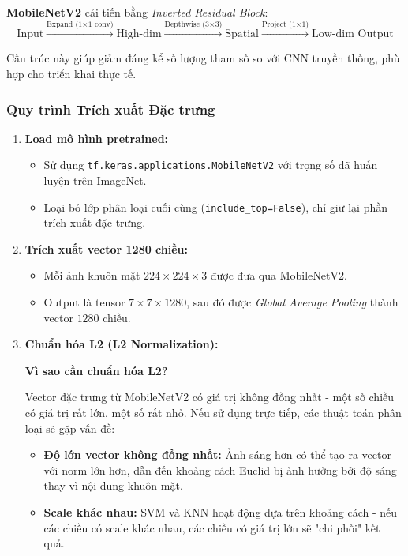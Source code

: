 \documentclass[a4paper]{book}
\begin{document}
\textbf{MobileNetV2} cải tiến bằng \textit{Inverted Residual Block}:
\[
\text{Input} \xrightarrow{\text{Expand (1×1 conv)}} \text{High-dim} \xrightarrow{\text{Depthwise (3×3)}} \text{Spatial} \xrightarrow{\text{Project (1×1)}} \text{Low-dim Output}
\]

Cấu trúc này giúp giảm đáng kể số lượng tham số so với CNN truyền thống, phù hợp cho triển khai thực tế.

\subsubsection{Quy trình Trích xuất Đặc trưng}
\begin{enumerate}
    \item \textbf{Load mô hình pretrained:} 
    \begin{itemize}
        \item Sử dụng \texttt{tf.keras.applications.MobileNetV2} với trọng số đã huấn luyện trên ImageNet.
        \item Loại bỏ lớp phân loại cuối cùng (\texttt{include\_top=False}), chỉ giữ lại phần trích xuất đặc trưng.
    \end{itemize}
    
    \item \textbf{Trích xuất vector 1280 chiều:} 
    \begin{itemize}
        \item Mỗi ảnh khuôn mặt $224 \times 224 \times 3$ được đưa qua MobileNetV2.
        \item Output là tensor $7 \times 7 \times 1280$, sau đó được \textit{Global Average Pooling} thành vector $1280$ chiều.
    \end{itemize}
    
    \item \textbf{Chuẩn hóa L2 (L2 Normalization):} 
    
    \textbf{Vì sao cần chuẩn hóa L2?}
    
    Vector đặc trưng từ MobileNetV2 có giá trị không đồng nhất - một số chiều có giá trị rất lớn, một số rất nhỏ. Nếu sử dụng trực tiếp, các thuật toán phân loại sẽ gặp vấn đề:
    
    \begin{itemize}
        \item \textbf{Độ lớn vector không đồng nhất:} Ảnh sáng hơn có thể tạo ra vector với norm lớn hơn, dẫn đến khoảng cách Euclid bị ảnh hưởng bởi độ sáng thay vì nội dung khuôn mặt.
        
        \item \textbf{Scale khác nhau:} SVM và KNN hoạt động dựa trên khoảng cách - nếu các chiều có scale khác nhau, các chiều có giá trị lớn sẽ "chi phối" kết quả.
        

\end{itemize}
\end{enumerate}
\end{document}
